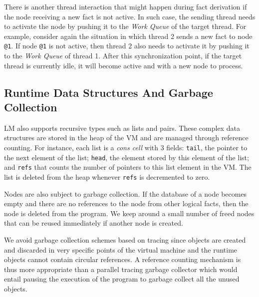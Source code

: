 There is another thread interaction that might happen during fact derivation if
the node receiving a new fact is not active. In such case, the sending thread
needs to activate the node by pushing it to the \emph{Work Queue} of the target
thread. For example, consider again the situation in which thread 2 sends a new
fact to node \texttt{@1}. If node \texttt{@1} is not active, then thread 2 also
needs to activate it by pushing it to the \emph{Work Queue} of thread 1. After
this synchronization point, if the target thread is currently idle, it will
become active and with a new node to process.

\subsection{Runtime Data Structures And Garbage Collection}

LM also supports recursive types such as lists and pairs. These complex data
structures are stored in the heap of the VM and are managed through reference
counting. For instance, each list is a \emph{cons cell} with 3 fields:
\texttt{tail}, the pointer to the next element of the list; \texttt{head}, the
element stored by this element of the list; and \texttt{refs} that counts the
number of pointers to this list element in the VM. The list is deleted from the
heap whenever \texttt{refs} is decremented to zero.

Nodes are also subject to garbage collection. If the database of a node becomes
empty and there are no references to the node from other logical facts, then
the node is deleted from the program. We keep around a small number of freed
nodes that can be reused immediately if another node is created.

We avoid garbage collection schemes based on tracing since objects are created
and discarded in very specific points of the virtual machine and the runtime
objects cannot contain circular references. A reference counting mechanism is
thus more appropriate than a parallel tracing garbage collector which would
entail pausing the execution of the program to garbage collect all the unused
objects.

